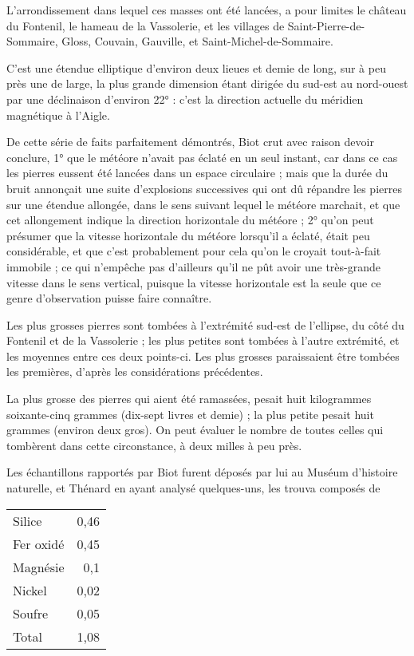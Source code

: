 \documentclass[a4paper, 12pt, oneside, french]{article}
\begin{document}
L'arrondissement dans lequel ces masses ont été lancées, a pour limites le château du Fontenil, le hameau de la Vassolerie, et les villages de Saint-Pierre-de-Sommaire, Gloss, Couvain, Gauville, et Saint-Michel-de-Sommaire.

C'est une étendue elliptique d'environ deux lieues et demie de long, sur à peu près une de large, la plus grande dimension étant dirigée du sud-est au nord-ouest par une déclinaison d'environ 22° : c'est la direction actuelle du méridien magnétique à l'Aigle.

De cette série de faits parfaitement démontrés, Biot crut avec raison devoir conclure, 1° que le météore n'avait pas éclaté en un seul instant, car dans ce cas les pierres eussent été lancées dans un espace circulaire ; mais que la durée du bruit annonçait une suite d'explosions successives qui ont dû répandre les pierres sur une étendue allongée, dans le sens suivant lequel le météore marchait, et que cet allongement indique la direction horizontale du météore ; 2° qu'on peut présumer que la vitesse horizontale du météore lorsqu'il a éclaté, était peu considérable, et que c'est probablement pour cela qu'on le croyait tout-à-fait immobile ; ce qui n'empêche pas d'ailleurs qu'il ne pût avoir une très-grande vitesse dans le sens vertical, puisque la vitesse horizontale est la seule que ce genre d'observation puisse faire connaître.

Les plus grosses pierres sont tombées à l'extrémité sud-est de l'ellipse, du côté du Fontenil et de la Vassolerie ; les plus petites sont tombées à l'autre extrémité, et les moyennes entre ces deux points-ci. Les plus grosses paraissaient être tombées les premières, d'après les considérations précédentes.

La plus grosse des pierres qui aient été ramassées, pesait huit kilogrammes soixante-cinq grammes (dix-sept livres et demie) ; la plus petite pesait huit grammes (environ deux gros). On peut évaluer le nombre de toutes celles qui tombèrent dans cette circonstance, à deux milles à peu près.

Les échantillons rapportés par Biot furent déposés par lui au Muséum d'histoire naturelle, et Thénard en ayant analysé quelques-uns, les trouva composés de
\begin{table}[H]
    \centering
    \begin{tabular}{l r}
        Silice & 0,46 \\
        Fer oxidé & 0,45 \\
        Magnésie & 0,1 \\
        Nickel & 0,02 \\
        Soufre & 0,05 \\ \hline
        Total & 1,08 \\
    \end{tabular}
\end{table}
\end{document}
